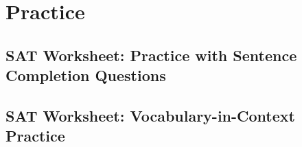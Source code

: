 \section{Practice}
\subsection{SAT Worksheet: Practice with Sentence Completion Questions}
\subsection{SAT Worksheet: Vocabulary-in-Context Practice}